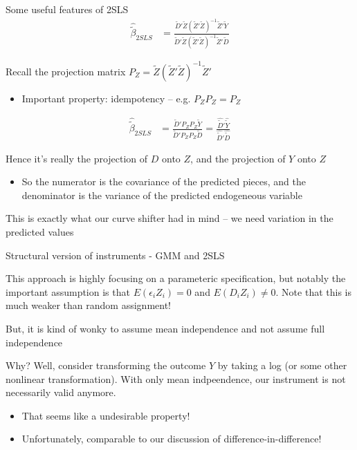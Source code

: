 \documentclass[notes,11pt, aspectratio=169]{beamer}
\newenvironment{wideitemize}{\itemize\addtolength{\itemsep}{10pt}}{\enditemize}
\begin{document}
\begin{frame}{Some useful features of 2SLS}
    \begin{align*}
      \hat{\widetilde{\beta}}_{2SLS} &= \frac{\widetilde{D}'\widetilde{Z} (\widetilde{Z}'\widetilde{Z})^{-1} \widetilde{Z}'\widetilde{Y}}{\widetilde{D}'\widetilde{Z} (\widetilde{Z}'\widetilde{Z})^{-1} \widetilde{Z}'\widetilde{D}}
    \end{align*}
  \begin{wideitemize}
  \item Recall the projection matrix
    $P_{Z} = \widetilde{Z} (\widetilde{Z}'\widetilde{Z})^{-1}
    \widetilde{Z}'$
    \begin{itemize}
    \item Important property: idempotency -- e.g. $P_{Z}P_{Z} = P_{Z}$
    \end{itemize}
    \begin{align*}
      \hat{\widetilde{\beta}}_{2SLS} &= \frac{\widetilde{D}'P_{Z}P_{Z}\widetilde{Y}}{\widetilde{D}'P_{Z}P_{Z}\widetilde{D}} = \frac{\hat{\widetilde{D}}'\hat{\widetilde{Y}}}{\hat{\widetilde{D}}'\hat{\widetilde{D}}} 
    \end{align*}
  \item Hence it's really the projection of $D$ onto $Z$, and the
    projection of $Y$ onto $Z$
    \begin{itemize}
    \item So the numerator is the covariance of the predicted pieces,
      and the denominator is the variance of the predicted endogeneous
      variable
    \end{itemize}
  \item This is exactly what our curve shifter had in mind -- we need
    variation in the predicted values
  \end{wideitemize}
\end{frame}

\begin{frame}{Structural version of instruments - GMM and 2SLS}
  \begin{wideitemize}
  \item This approach is highly focusing on a parameteric
    specification, but notably the important assumption is that
    $E(\epsilon_{i}Z_{i}) = 0$ and $E(D_{i}Z_{i}) \not=0$. Note that
    this is much weaker than random assignment!
  \item But, it is kind of wonky to assume mean independence and not
    assume full independence
  \item Why? Well, consider transforming the outcome $Y$ by taking a
    log (or some other nonlinear transformation). With only mean
    indpeendence, our instrument is not necessarily valid anymore.
    \begin{itemize}
    \item That seems like a undesirable property!
    \item Unfortunately, comparable to our discussion of difference-in-difference!
    \end{itemize}
  \end{wideitemize}
\end{frame}
\end{document}
